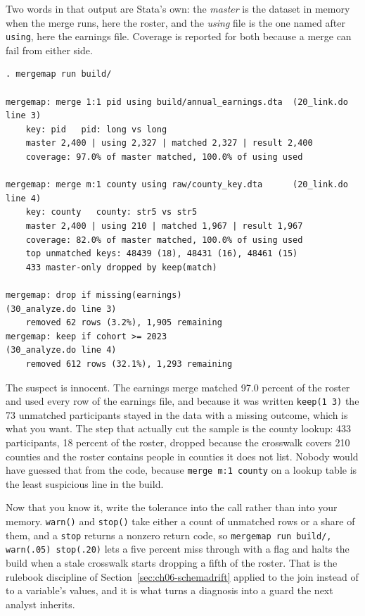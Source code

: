 Two words in that output are Stata's own: the \emph{master} is the dataset in memory when the merge runs, here the roster, and the \emph{using} file is the one named after \texttt{using}, here the earnings file. Coverage is reported for both because a merge can fail from either side.
\par
{\footnotesize
\begin{verbatim}
. mergemap run build/

mergemap: merge 1:1 pid using build/annual_earnings.dta  (20_link.do line 3)
    key: pid   pid: long vs long
    master 2,400 | using 2,327 | matched 2,327 | result 2,400
    coverage: 97.0% of master matched, 100.0% of using used

mergemap: merge m:1 county using raw/county_key.dta      (20_link.do line 4)
    key: county   county: str5 vs str5
    master 2,400 | using 210 | matched 1,967 | result 1,967
    coverage: 82.0% of master matched, 100.0% of using used
    top unmatched keys: 48439 (18), 48431 (16), 48461 (15)
    433 master-only dropped by keep(match)

mergemap: drop if missing(earnings)                      (30_analyze.do line 3)
    removed 62 rows (3.2%), 1,905 remaining
mergemap: keep if cohort >= 2023                         (30_analyze.do line 4)
    removed 612 rows (32.1%), 1,293 remaining
\end{verbatim}
}
The suspect is innocent. The earnings merge matched 97.0 percent of the roster and used every row of the earnings file, and because it was written \texttt{keep(1 3)} the 73 unmatched participants stayed in the data with a missing outcome, which is what you want. The step that actually cut the sample is the county lookup: 433 participants, 18 percent of the roster, dropped because the crosswalk covers 210 counties and the roster contains people in counties it does not list. Nobody would have guessed that from the code, because \texttt{merge m:1 county} on a lookup table is the least suspicious line in the build.

Now that you know it, write the tolerance into the call rather than into your memory. \texttt{warn()} and \texttt{stop()} take either a count of unmatched rows or a share of them, and a \texttt{stop} returns a nonzero return code, so \texttt{mergemap run build/, warn(.05) stop(.20)} lets a five percent miss through with a flag and halts the build when a stale crosswalk starts dropping a fifth of the roster. That is the rulebook discipline of Section~\ref{sec:ch06-schemadrift} applied to the join instead of to a variable's values, and it is what turns a diagnosis into a guard the next analyst inherits.

